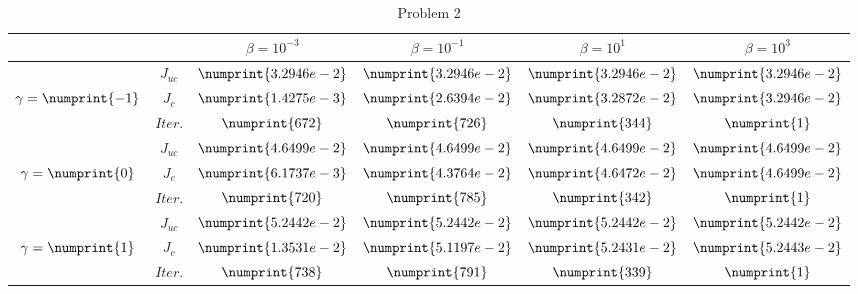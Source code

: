 \begin{table}
\begin{tabular}{ ||c|| c | c | c | c | c ||}
\hline
& & $\beta = 10^{-3}$ & $\beta = 10^{-1}$ & $\beta = 10^{1}$ & $\beta = 10^{3}$  \\
\hline
 & $J_{uc}$ & $\numprint{3.2946e-2}$ & $\numprint{3.2946e-2}$ & $\numprint{3.2946e-2}$ & $\numprint{3.2946e-2}$ \\
$\gamma= \numprint{-1}$  & $J_c$ & $\numprint{1.4275e-3}$ & $\numprint{2.6394e-2}$ & $\numprint{3.2872e-2}$ & $\numprint{3.2946e-2}$ \\
& $Iter.$ & $\numprint{672}$ & $\numprint{726}$ & $\numprint{344}$ & $\numprint{1}$ \\
\hline
 & $J_{uc}$ & $\numprint{4.6499e-2}$ & $\numprint{4.6499e-2}$ & $\numprint{4.6499e-2}$ & $\numprint{4.6499e-2}$ \\
$\gamma= \numprint{0}$  & $J_c$ & $\numprint{6.1737e-3}$ & $\numprint{4.3764e-2}$ & $\numprint{4.6472e-2}$ & $\numprint{4.6499e-2}$ \\
& $Iter.$ & $\numprint{720}$ & $\numprint{785}$ & $\numprint{342}$ & $\numprint{1}$ \\
\hline
 & $J_{uc}$ & $\numprint{5.2442e-2}$ & $\numprint{5.2442e-2}$ & $\numprint{5.2442e-2}$ & $\numprint{5.2442e-2}$ \\
$\gamma= \numprint{1}$  & $J_c$ & $\numprint{1.3531e-2}$ & $\numprint{5.1197e-2}$ & $\numprint{5.2431e-2}$ & $\numprint{5.2443e-2}$ \\
& $Iter.$ & $\numprint{738}$ & $\numprint{791}$ & $\numprint{339}$ & $\numprint{1}$ \\
\hline
\end{tabular}
\caption{Problem 2}
\label{TabS5:Prob22D}
\end{table}